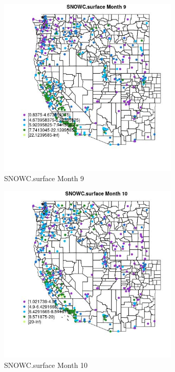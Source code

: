 \begin{figure} 
\centering  
\includegraphics[width=0.77\textwidth]{Code_Outputs/ML_input_report_ML_input_PM25_Step5_part_d_de_duplicated_aves_ML_input_MapObsMo9SNOWCsurface.jpg} 
\caption{\label{fig:ML_input_report_ML_input_PM25_Step5_part_d_de_duplicated_aves_ML_inputMapObsMo9SNOWCsurface}SNOWC.surface Month 9} 
\end{figure} 
 

\begin{figure} 
\centering  
\includegraphics[width=0.77\textwidth]{Code_Outputs/ML_input_report_ML_input_PM25_Step5_part_d_de_duplicated_aves_ML_input_MapObsMo10SNOWCsurface.jpg} 
\caption{\label{fig:ML_input_report_ML_input_PM25_Step5_part_d_de_duplicated_aves_ML_inputMapObsMo10SNOWCsurface}SNOWC.surface Month 10} 
\end{figure} 
 

